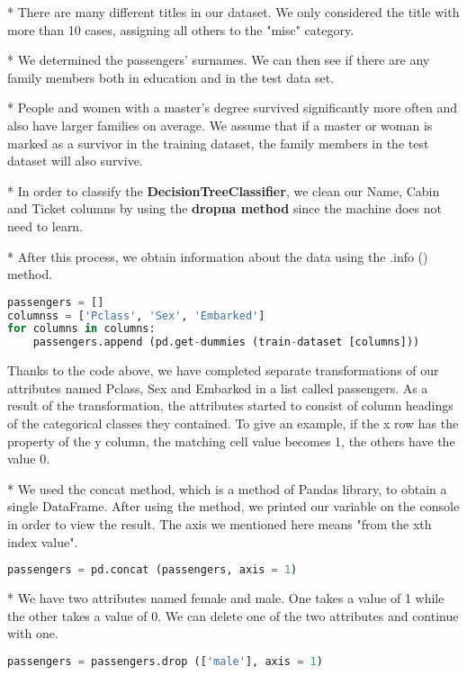 \documentclass[onecolumn]{article}
\begin{document}
* There are many different titles in our dataset. We only considered the title with more than 10 cases, assigning all others to the "misc" category.

* We determined the passengers' surnames. We can then see if there are any family members both in education and in the test data set.

* People and women with a master's degree survived significantly more often and also have larger families on average. We assume that if a master or woman is marked as a survivor in the training dataset, the family members in the test dataset will also survive.

* In order to classify the \textbf{DecisionTreeClassifier}, we clean our Name, Cabin and Ticket columns by using the \textbf{dropna method} since the machine does not need to learn.

* After this process, we obtain information about the data using the .info () method.
\begin{lstlisting}[language=Python, caption= get-dummies] 
passengers = []
columnss = ['Pclass', 'Sex', 'Embarked'] 
for columns in columns:
	passengers.append (pd.get-dummies (train-dataset [columns])) 
    \end{lstlisting}

Thanks to the code above, we have completed separate transformations of our attributes named Pclass, Sex and Embarked in a list called passengers. As a result of the transformation, the attributes started to consist of column headings of the categorical classes they contained. To give an example, if the x row has the property of the y column, the matching cell value becomes 1, the others have the value 0.

* We used the concat method, which is a method of Pandas library, to obtain a single DataFrame. After using the method, we printed our variable on the console in order to view the result. The axis we mentioned here means "from the xth index value".

\begin{lstlisting}[language=Python, caption= concat] 
passengers = pd.concat (passengers, axis = 1)
\end{lstlisting}


* We have two attributes named female and male. One takes a value of 1 while the other takes a value of 0. We can delete one of the two attributes and continue with one.

\begin{lstlisting}[language=Python, caption= drop male] 
passengers = passengers.drop (['male'], axis = 1)
\end{lstlisting}
\end{document}
